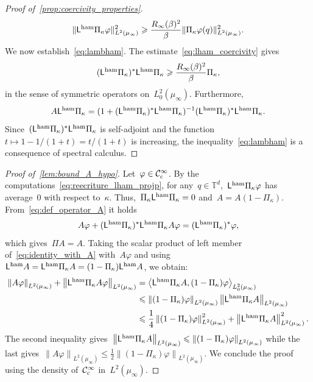 \documentclass[onefignum,onetabnum]{siamart251216} %
\newcommand{\norm}[1]{\left\lVert#1\right\rVert}
\newcommand{\torus}{\mathbb T}
\newcommand{\mc}[1]{\mathcal{#1}}
\renewcommand{\leq}{\leqslant}
\renewcommand{\geq}{\geqslant}
\newcommand{\mescin}{\mu}
\newcommand{\mesvit}{\kappa}
\newcommand{\poinccu}{R_{\infty}(\beta)}
\newcommand{\projp}{\Pi}
\newcommand{\projvit}{\Pi_{\kappa}}
\newcommand{\Lham}{\mathsf{L}^{\rm{ham}}}
\newcommand{\slangle}[1]{\left\langle #1 \right\rangle}
\newcommand{\norml}[1]{\norm{#1}_{L^2(\mescin_\infty)}}
\theoremstyle{plain}
\numberwithin{equation}{section}
\numberwithin{theorem}{section}
\begin{document}
\begin{proof}[{Proof of~\cref{prop:coercivity_properties}}]
   \begin{align*}
    \|\Lham\projvit \varphi\|_{L^2(\mescin_\infty)}^2 \geq \frac{\poinccu^2}{\beta} \|\projvit \varphi(q)\|_{L^2(\mescin_\infty)}^2.
   \end{align*}
    We now establish~\eqref{eq:lambham}. The estimate~\eqref{eq:lham_coercivity} gives
   \begin{align}
    \label{eq:op_sym_ovd}
    (\Lham\projvit)^*\Lham\projvit \geq \frac{\poinccu^2}{\beta}\projvit,
   \end{align}
    in the sense of symmetric operators on~$L_0^2(\mescin_\infty)$.
   Furthermore,
   \begin{align*}
        A\Lham\projvit = (1+(\Lham\projvit)^*\Lham\projvit)^{-1}(\Lham\projvit)^*\Lham\projvit.
   \end{align*}
   Since~$(\Lham\projvit)^*\Lham\projvit$ is self-adjoint and the function~$t \mapsto 1 - 1/(1+t) = t/(1+t)$ is increasing, the inequality~\eqref{eq:lambham} is a consequence of spectral calculus.
\end{proof}
\iffalse
\begin{proof}[{Proof of~\cref{lem:bound_A_hypo}}]
    Let~$\varphi\in\mc{C}_{\rm c}^\infty$. By the computations~\eqref{eq:reecriture_lham_projp}, for any~$q\in \torus^d$,~$\Lham\projvit\varphi$ has average~$0$ with respect to~$\mesvit$. Thus,~$\projvit\Lham\projvit = 0$ and~$A=A(1-\projvit)$.
    From~\eqref{eq:def_operator_A} it holds
    \begin{align}
        \label{eq:identity_with_A}
        A\varphi + (\Lham\projvit)^*\Lham\projvit A\varphi = (\Lham\projvit)^*\varphi,
    \end{align}
    which gives~$\projp A = A$. Taking the scalar product of left member of~\eqref{eq:identity_with_A} with~$A\varphi$ and using~$\Lham A= \Lham\projvit A = (1-\projvit)\Lham A$, we obtain:
    \begin{align*}
        \norml{A\varphi} + \norml{\Lham\projvit A\varphi}
        &= \slangle{\Lham\projvit A,(1-\projvit)\varphi}_{L_0^2(\mescin_\infty)} \\
        &\leq \norml{(1-\projvit)\varphi}\norml{\Lham\projvit A}\\
        &\leq \frac14\norml{(1-\projvit)\varphi}^2+\norml{\Lham\projvit A}^2.
    \end{align*}
    The second inequality gives~$\norml{\Lham\projvit A} \leq \norml{(1-\projvit)\varphi}$ while the last gives~$\norml{A\varphi}\leq \frac12 \norml{(1-\projvit)\varphi}$. We conclude the proof using the density of~$\mc{C}_{\rm c}^\infty$ in~$L^2(\mescin_\infty)$.
\end{proof}
\end{document}
